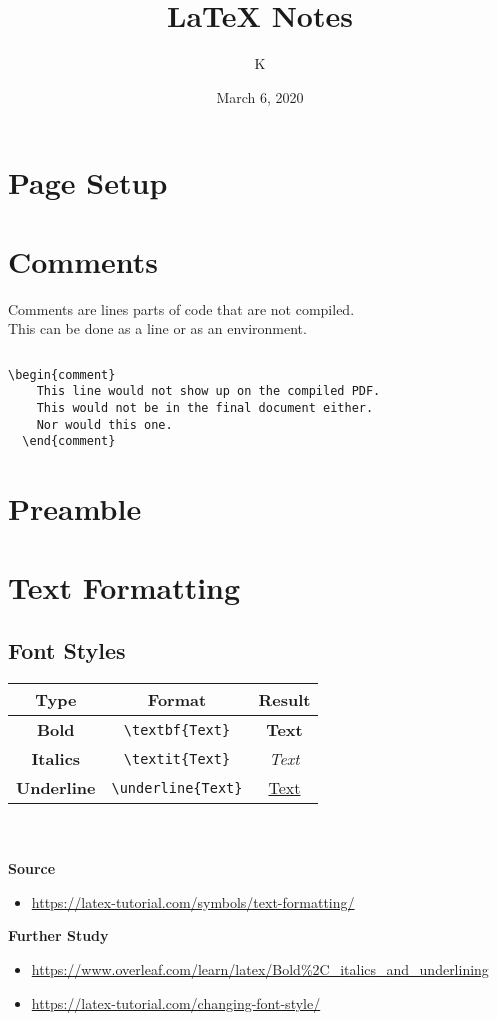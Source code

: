 \documentclass[10pt, letterpaper]{article}
\title{LaTeX Notes}
\author{K}
\date{March 6, 2020}
\begin{document}
\maketitle
\tableofcontents{}
\pagebreak

\section{Page Setup}

\section{Comments}
Comments are lines parts of code that are not compiled.\\
This can be done as a line or as an environment.

\lstset{style=basicstyle}
\begin{lstlisting}[title=Comment by Line]
  % This line would not show up on the compiled PDF.
\end{lstlisting}

\begin{lstlisting}[title=Comment by environment]
  \begin{comment}
    This line would not show up on the compiled PDF.
    This would not be in the final document either.
    Nor would this one.
  \end{comment}
\end{lstlisting}

\section{Preamble}

\section{Text Formatting}
\subsection{Font Styles}
\begin{tabular}{c c c}
  Type & Format & Result\\
  \hline
  \textbf{Bold} & \verb|\textbf{Text}| & \textbf{Text}\\
  \textbf{Italics} & \verb|\textit{Text}| & \textit{Text}\\
  \textbf{Underline} & \verb|\underline{Text}| & \underline{Text}
\end{tabular}\\
\\
\textbf{Source}
\begin{itemize}
  \item \url{https://latex-tutorial.com/symbols/text-formatting/}
\end{itemize}
\textbf{Further Study}
\begin{itemize}
  \item \url{https://www.overleaf.com/learn/latex/Bold%2C_italics_and_underlining}
  \item \url{https://latex-tutorial.com/changing-font-style/}
\end{itemize}
\end{document}
